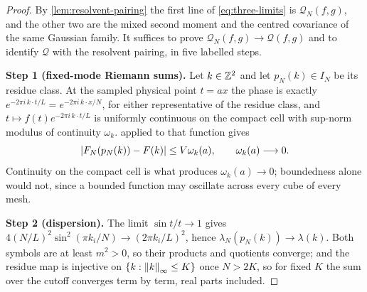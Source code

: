 \begin{proof}
By \cref{lem:resolvent-pairing} the first line of \eqref{eq:three-limits} is
$\mathcal Q_N(f,g)$, and the other two are the mixed second moment and the
centred covariance of the same Gaussian family. It suffices to prove
$\mathcal Q_N(f,g)\to\mathcal Q(f,g)$ and to identify $\mathcal Q$ with the
resolvent pairing, in five labelled steps.

\textbf{Step 1 (fixed-mode Riemann sums).} Let $k\in\mathbb{Z}^2$ and let
$p_N(k)\in I_N$ be its residue class. At the sampled physical point $t=a x$ the
phase is exactly $e^{-2\pi i\,k\cdot t/L}=e^{-2\pi i\,k\cdot x/N}$, for either
representative of the residue class, and
$t\mapsto f(t)e^{-2\pi i\,k\cdot t/L}$ is uniformly continuous on the compact
cell with sup-norm modulus of continuity $\omega_k$. 
applied to that function gives
\begin{equation}\label{eq:fixed-mode}
  \left| F_N(p_N(k))-F(k) \right|\le V\omega_k(a),
  \qquad \omega_k(a)\longrightarrow0.
\end{equation}
Continuity on the compact cell is what produces $\omega_k(a)\to0$; boundedness
alone would not, since a bounded function may oscillate across every cube of
every mesh.

\textbf{Step 2 (dispersion).} The limit $\sin t/t\to1$ gives
$4(N/L)^2\sin^2(\pi k_i/N)\to(2\pi k_i/L)^2$, hence
$\lambda_N(p_N(k))\to\lambda(k)$. Both symbols are at least $m^2>0$, so their
products and quotients converge; and the residue map is injective on
$\{k:\left\| k \right\|_\infty\le K\}$ once $N>2K$, so for fixed $K$ the sum over the
cutoff converges term by term, real parts included.


\end{proof}
